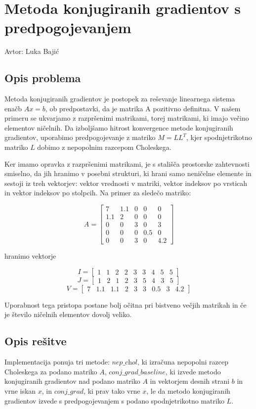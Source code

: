 \documentclass[12pt,a4paper]{article}
\begin{document}
\section{Metoda konjugiranih gradientov s predpogojevanjem}
Avtor: Luka Bajić


\subsection{Opis problema}
Metoda konjugiranih gradientov je postopek za reševanje linearnega sistema enačb $Ax = b$, ob predpostavki, da je matrika A pozitivno definitna. V našem primeru se ukvarjamo z razpršenimi matrikami, torej matrikami, ki imajo večino elementov ničelnih. Da izboljšamo hitrost konvergence metode konjugiranih gradientov, uporabimo predpogojevanje z matriko $M=LL^T$, kjer spodnjetrikotno matriko $L$ dobimo z nepopolnim razcepom Choleskega. 


Ker imamo opravka z razpršenimi matrikami, je s stališča prostorske zahtevnosti smiselno, da jih hranimo v posebni strukturi, ki hrani samo neničelne elemente in sestoji iz treh vektorjev: vektor  vrednosti v matriki, vektor indeksov po vrsticah in vektor indeksov po stolpcih. Na primer za sledečo matriko:


\[
A=\begin{bmatrix}7 & 1.1 & 0 & 0 & 0 \\ 1.1 & 2 & 0 & 0 & 0 \\ 0 & 0 & 3 & 0 & 3 \\ 0 & 0 & 0 & 0.5 & 0 \\ 0 & 0 & 3 & 0 & 4.2 \end{bmatrix}
\]

hranimo vektorje


\[
I = \begin{bmatrix}1 & 1 & 2 & 2 & 3 & 3 & 4 & 5 & 5 \end{bmatrix}
\]
\[
J = \begin{bmatrix}1 & 2 & 1 & 2 & 3 & 5 & 4 & 3 & 5 \end{bmatrix}
\]
\[
V = \begin{bmatrix}7 & 1.1 & 1.1 & 2 & 3 & 3 & 0.5 & 3 & 4.2 \end{bmatrix}
\]

Uporabnost tega pristopa postane bolj očitna pri bistveno večjih matrikah in če je število ničelnih elementov dovolj veliko.


\subsection{Opis rešitve}
Implementacija ponuja tri metode: $\textit{nep\_chol}$, ki izračuna nepopolni razcep Choleskega za podano matriko $A$, $\textit{conj\_grad\_baseline}$, ki izvede metodo konjugiranih gradientov nad podano matriko $A$ in vektorjem desnih strani $b$ in vrne iskan $x$, in $\textit{conj\_grad}$,  ki prav tako vrne $x$, le da metodo konjugiranih gradientov izvede s predpogojevanjem s podano  spodnjetrikotno matriko $L$.
\end{document}
